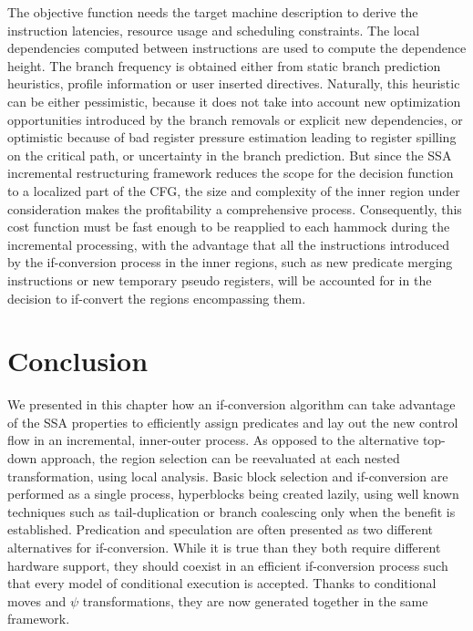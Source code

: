 The objective function needs the target machine description to derive the instruction latencies, resource usage and scheduling constraints. The local dependencies computed between instructions are used to compute the dependence height. The branch frequency is obtained either from static branch prediction heuristics, profile information or user inserted directives. Naturally, this heuristic can be either pessimistic, because it does not take into account new optimization opportunities introduced by the branch removals or explicit new dependencies, or optimistic because of bad register pressure estimation leading to register spilling on the critical path, or uncertainty in the branch prediction. But since the SSA incremental restructuring framework reduces the scope for the decision function to a localized part of the CFG, the size and complexity of the inner region under consideration makes the profitability a comprehensive process. Consequently, this cost function must be fast enough to be reapplied to each hammock during the incremental processing, with the advantage that all the instructions introduced by the if-conversion process in the inner regions, such as new predicate merging instructions or new temporary pseudo registers, will be accounted for in the decision to if-convert the regions encompassing them.

\section{Conclusion} 

We presented in this chapter how an if-conversion algorithm can take advantage of the SSA properties to efficiently assign predicates and lay out the new control flow in an incremental, inner-outer process. As opposed to the alternative top-down approach, the region selection can be reevaluated at each nested transformation, using local analysis.
Basic block selection and if-conversion are performed as a single process, hyperblocks being created lazily, using well known techniques such as tail-duplication or branch coalescing only when the benefit is established.
Predication and speculation are often presented as two different alternatives for if-conversion. While it is true than they both require different hardware support, they should coexist in an efficient if-conversion process such that every model of conditional execution is accepted. Thanks to conditional moves and $\psi$ transformations, they are now generated together in the same framework.

